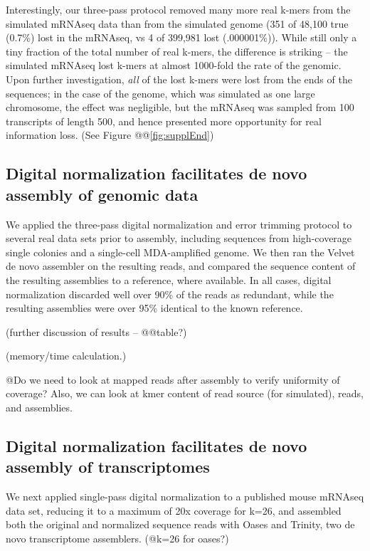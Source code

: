 \documentclass[10pt]{article}
\begin{document}
Interestingly, our three-pass protocol removed many more real k-mers
from the simulated mRNAseq data than from the simulated genome (351 of
48,100 true (0.7\%) lost in the mRNAseq, vs 4 of 399,981 lost
(.000001\%)).  While still only a tiny fraction of the total number of
real k-mers, the difference is striking -- the simulated mRNAseq lost
k-mers at almost 1000-fold the rate of the genomic.  Upon further
investigation, {\em all} of the lost k-mers were lost from the ends
of the sequences; in the case of the genome, which was simulated as
one large chromosome, the effect was negligible, but the mRNAseq
was sampled from 100 transcripts of length 500, and hence presented
more opportunity for real information loss.  (See Figure @@\ref{fig:supplEnd})

\subsection*{Digital normalization facilitates de novo assembly of genomic data}

We applied the three-pass digital normalization and error trimming
protocol to several real data sets prior to assembly, including
sequences from high-coverage single colonies and a single-cell
MDA-amplified genome.  We then ran the Velvet de novo assembler on the
resulting reads, and compared the sequence content of the resulting
assemblies to a reference, where available.  In all cases, digital
normalization discarded well over 90\% of the reads as redundant,
while the resulting assemblies were over 95\% identical to the known
reference.

(further discussion of results -- @@table?)

(memory/time calculation.)

@Do we need to look at mapped reads after assembly to verify uniformity
of coverage? Also, we can look at kmer content of read source (for
simulated), reads, and assemblies.

\subsection*{Digital normalization facilitates de novo assembly of transcriptomes}

We next applied single-pass digital normalization to a published
mouse mRNAseq data set, reducing it to a maximum of 20x coverage for
k=26, and assembled both the original and normalized sequence reads
with Oases and Trinity, two de novo transcriptome assemblers. (@k=26 for oases?)
\end{document}
